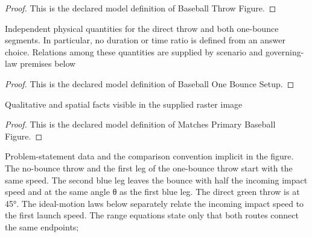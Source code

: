 \begin{proof}
  This is the declared model definition of Baseball Throw Figure.
\end{proof}
\begin{definition}
  \label{def:physics:phyx-mini-0693:phyxminiproblems-problemphyxmini0693-baseballonebouncesetup}
  Independent physical quantities for the direct throw and both one-bounce segments. In particular, no duration or time ratio is defined from an answer choice. Relations among these quantities are supplied by scenario and governing-law premises below
\end{definition}
\begin{proof}
  This is the declared model definition of Baseball One Bounce Setup.
\end{proof}
\begin{definition}
  \label{def:physics:phyx-mini-0693:phyxminiproblems-problemphyxmini0693-matchesprimarybaseballfigure}
  Qualitative and spatial facts visible in the supplied raster image
\end{definition}
\begin{proof}
  This is the declared model definition of Matches Primary Baseball Figure.
\end{proof}
\begin{definition}
  \label{def:physics:phyx-mini-0693:phyxminiproblems-problemphyxmini0693-matchesbaseballthrowscenario}
  Problem-statement data and the comparison convention implicit in the figure. The no-bounce throw and the first leg of the one-bounce throw start with the same speed. The second blue leg leaves the bounce with half the incoming impact speed and at the same angle θ as the first blue leg. The direct green throw is at 45°. The ideal-motion laws below separately relate the incoming impact speed to the first launch speed. The range equations state only that both routes connect the same endpoints;
\end{definition}
